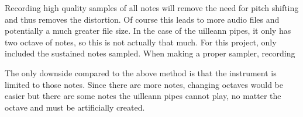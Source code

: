 \documentclass[12pt]{article}
\begin{document}
	Recording high quality samples of all notes will remove the need for pitch shifting and thus removes the distortion. Of course
	this leads to more audio files and potentially a much greater file size. In the case of the uilleann pipes, it only has two octave
	of notes, so this is not actually that much. For this project, only included the sustained notes sampled. When making a proper
	sampler, recording 
	
	The only downside compared to the above method is that the instrument is limited to those notes. 
	Since there are more notes, changing octaves would be easier but there are some notes the uilleann pipes cannot play,
	no matter the octave and must be artificially created.
		
	
\printbibliography
	
		
\end{document}
